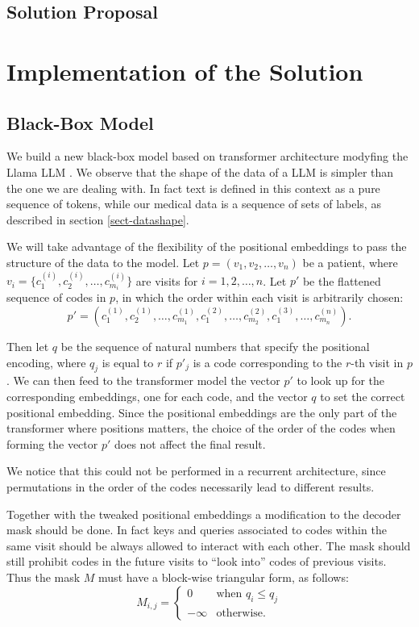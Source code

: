 \documentclass[]{marticle}
\begin{document}
\subsection{Solution Proposal}

\section{Implementation of the Solution}

\subsection{Black-Box Model}

We build a new black-box model based on transformer architecture modyfing the Llama LLM . We observe that the shape of the data of a LLM is simpler than the one we
are dealing with. In fact text is defined in this context as a pure sequence of tokens, while our
medical data is a sequence of sets of labels, as described in section \ref{sect-datashape}.

We will take advantage of the flexibility of the positional embeddings to pass the structure of the
data to the model. Let $p=(v_1, v_2, \dots, v_n)$ be a patient, where $v_i=\{c^{(i)}_1, c^{(i)}_2,
\dots, c^{(i)}_{m_i}\}$ are visits for $i=1,2,\dots, n$. Let $p'$ be the flattened sequence of codes
in $p$, in which the order within each visit is arbitrarily chosen:
\begin{equation*}
    p' = (c^{(1)}_1, c^{(1)}_2, \dots, c^{(1)}_{m_1}, c^{(2)}_1, \dots, c^{(2)}_{m_2}, c^{(3)}_1,
    \dots, c^{(n)}_{m_n}).
\end{equation*}

Then let $q$ be the sequence of natural numbers that specify the positional encoding, where $q_j$ is
equal to $r$ if $p'_j$ is a code corresponding to the $r$-th visit in $p$. We can then feed to the
transformer model the vector $p'$ to look up for the corresponding embeddings, one for each code,
and the vector $q$ to set the correct positional embedding. Since the positional embeddings are the
only part of the transformer where positions matters, the choice of the order of the codes when
forming the vector $p'$ does not affect the final result.

We notice that this could not be performed in a recurrent architecture, since permutations in the
order of the codes necessarily lead to different results.

Together with the tweaked positional embeddings a modification to the decoder mask should be done.
In fact keys and queries associated to codes within the same visit should be always allowed to
interact with each other. The mask should still prohibit codes in the future visits to ``look
into'' codes of previous visits. Thus the mask $M$ must have a block-wise triangular form, as
follows:
\begin{equation*}
    M_{i,j} = \begin{cases}
        0       & \text{when $q_i\leq q_j$} \\
        -\infty & \text{otherwise.}
    \end{cases}
\end{equation*}
\end{document}
